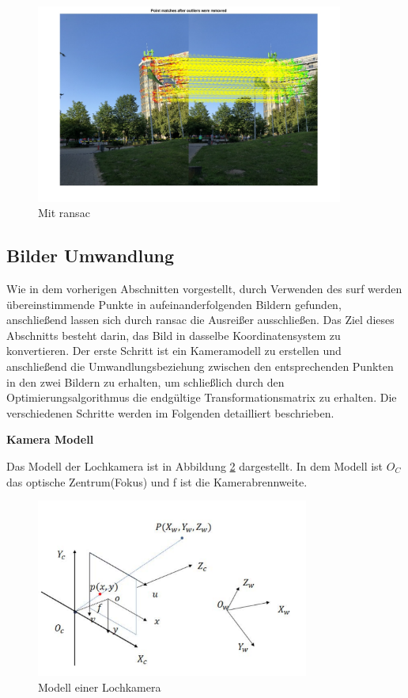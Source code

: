 \begin{figure}[H]
 \centering 
 \includegraphics[keepaspectratio,width=0.9\textwidth]{images/3_Ersteverfahren/RANSAC/MitRANSAC.pdf}
 \caption{Mit \gls{ransac}}
 \label{fig:MitRANSAC}
\end{figure} 


\subsection{Bilder Umwandlung}

Wie in dem vorherigen Abschnitten vorgestellt, durch Verwenden des \gls{surf} werden übereinstimmende Punkte in aufeinanderfolgenden Bildern gefunden, anschließend lassen sich durch \gls{ransac} die Ausreißer ausschließen. Das Ziel dieses Abschnitts besteht darin, das Bild in dasselbe Koordinatensystem zu konvertieren. Der erste Schritt ist ein Kameramodell zu erstellen und anschließend die Umwandlungsbeziehung zwischen den entsprechenden Punkten in den zwei Bildern zu erhalten, um schließlich durch den Optimierungsalgorithmus die endgültige Transformationsmatrix zu erhalten. Die verschiedenen Schritte werden im Folgenden detailliert beschrieben.

\textbf{Kamera Modell}

Das Modell der Lochkamera ist in Abbildung \ref{fig:cameramodel} dargestellt. In dem Modell ist $O_C$ das optische Zentrum(Fokus) und f ist die Kamerabrennweite.

\begin{figure}[htb]
 \centering 
 \includegraphics[keepaspectratio,width=0.8\textwidth]{images/3_Ersteverfahren/Kamera/cameramodel.pdf}
 \caption{Modell einer Lochkamera}
 \label{fig:cameramodel}
\end{figure} 

